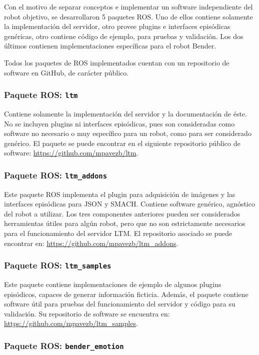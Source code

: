 Con el motivo de separar conceptos e implementar un software independiente del robot objetivo, se desarrollaron 5 paquetes ROS. Uno de ellos contiene solamente la implementación del servidor, otro provee plugins e interfaces episódicas genéricas, otro contiene código de ejemplo, para pruebas y validación. Los dos últimos contienen implementaciones específicas para el robot Bender.

Todos los paquetes de ROS implementados cuentan con un repositorio de software en GitHub, de carácter público.

\subsubsection{Paquete ROS: \texttt{ltm}}

Contiene solamente la implementación del servidor y la documentación de éste. No se incluyen plugins ni interfaces episódicas, pues son consideradas como software no necesario o muy específico para un robot, como para ser considerado genérico. El paquete se puede encontrar en el siguiente repositorio público de software: \url{https://github.com/mpavezb/ltm}.

\subsubsection{Paquete ROS: \texttt{ltm\_addons}}

Este paquete ROS implementa el plugin para adquisición de imágenes y las interfaces episódicas para JSON y SMACH. Contiene software genérico, agnóstico del robot a utilizar. Los tres componentes anteriores pueden ser considerados herramientas útiles para algún robot, pero que no son estrictamente necesarios para el funcionamiento del servidor LTM. El repositorio asociado se puede encontrar en: \url{https://github.com/mpavezb/ltm\_addons}.

\subsubsection{Paquete ROS: \texttt{ltm\_samples}}

Este paquete contiene implementaciones de ejemplo de algunos plugins episódicos, capaces de generar información ficticia. Además, el paquete contiene software útil para pruebas del funcionamiento del servidor y código para su validación. Su repositorio de software se encuentra en: \url{https://github.com/mpavezb/ltm\_samples}.

\subsubsection{Paquete ROS: \texttt{bender\_emotion}}

